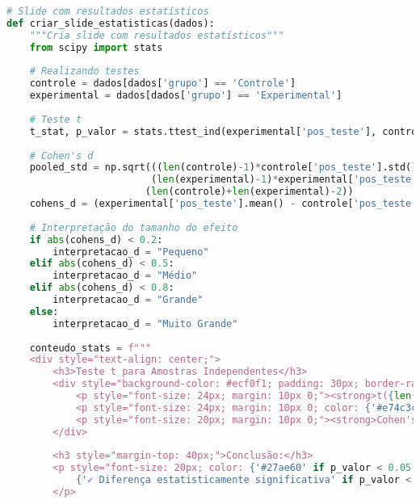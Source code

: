 \begin{pythonbox}
\begin{lstlisting}[language=Python]
# Slide com resultados estatísticos
def criar_slide_estatisticas(dados):
    """Cria slide com resultados estatísticos"""
    from scipy import stats
    
    # Realizando testes
    controle = dados[dados['grupo'] == 'Controle']
    experimental = dados[dados['grupo'] == 'Experimental']
    
    # Teste t
    t_stat, p_valor = stats.ttest_ind(experimental['pos_teste'], controle['pos_teste'])
    
    # Cohen's d
    pooled_std = np.sqrt(((len(controle)-1)*controle['pos_teste'].std()**2 + 
                         (len(experimental)-1)*experimental['pos_teste'].std()**2) / 
                        (len(controle)+len(experimental)-2))
    cohens_d = (experimental['pos_teste'].mean() - controle['pos_teste'].mean()) / pooled_std
    
    # Interpretação do tamanho do efeito
    if abs(cohens_d) < 0.2:
        interpretacao_d = "Pequeno"
    elif abs(cohens_d) < 0.5:
        interpretacao_d = "Médio"
    elif abs(cohens_d) < 0.8:
        interpretacao_d = "Grande"
    else:
        interpretacao_d = "Muito Grande"
    
    conteudo_stats = f"""
    <div style="text-align: center;">
        <h3>Teste t para Amostras Independentes</h3>
        <div style="background-color: #ecf0f1; padding: 30px; border-radius: 10px; margin: 20px 0;">
            <p style="font-size: 24px; margin: 10px 0;"><strong>t({len(dados)-2}) = {t_stat:.3f}</strong></p>
            <p style="font-size: 24px; margin: 10px 0; color: {'#e74c3c' if p_valor < 0.05 else '#95a5a6'};"><strong>p = {p_valor:.4f}</strong></p>
            <p style="font-size: 20px; margin: 10px 0;"><strong>Cohen's d = {cohens_d:.3f}</strong> <em>({interpretacao_d})</em></p>
        </div>
        
        <h3 style="margin-top: 40px;">Conclusão:</h3>
        <p style="font-size: 20px; color: {'#27ae60' if p_valor < 0.05 else '#e74c3c'};">
            {'✓ Diferença estatisticamente significativa' if p_valor < 0.05 else '✗ Diferença não significativa'}
        </p>
           \end{lstlisting}
\end{pythonbox}

